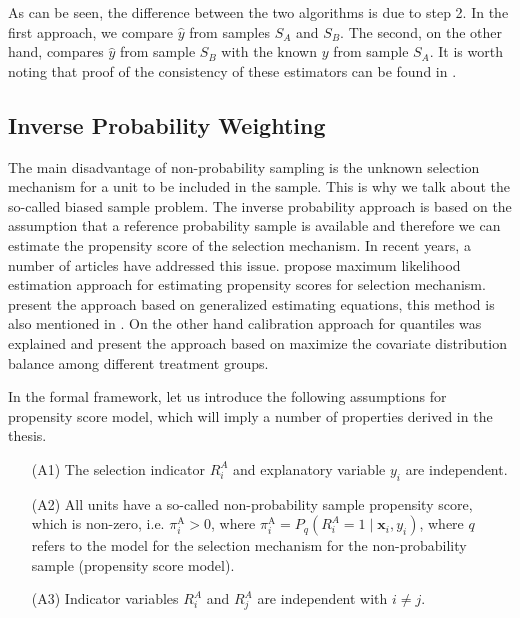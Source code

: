 \documentclass[
]{jss}
\begin{document}
As can be seen, the difference between the two algorithms is due to step
2. In the first approach, we compare \(\hat{y}\) from samples \(S_A\)
and \(S_B\). The second, on the other hand, compares \(\hat{y}\) from
sample \(S_B\) with the known \(y\) from sample \(S_A\). It is worth
noting that proof of the consistency of these estimators can be found in
\citet{Beres}.

\subsection{Inverse Probability Weighting}\label{sec-ipw}

The main disadvantage of non-probability sampling is the unknown
selection mechanism for a unit to be included in the sample. This is why
we talk about the so-called biased sample problem. The inverse
probability approach is based on the assumption that a reference
probability sample is available and therefore we can estimate the
propensity score of the selection mechanism. In recent years, a number
of articles have addressed this issue. \cite{chen2020doubly} propose
maximum likelihood estimation approach for estimating propensity scores
for selection mechanism. \cite{wu2022statistical} present the approach
based on generalized estimating equations, this method is also mentioned
in \cite{yang_doubly_2020}. On the other hand calibration approach for
quantiles was explained \cite{beresewicz2024inference} and
\cite{santanna_covariate_2022} present the approach based on maximize
the covariate distribution balance among different treatment groups.

In the formal framework, let us introduce the following assumptions for
propensity score model, which will imply a number of properties derived
in the thesis.

\begin{itemize}
    \item[(A1)] The selection indicator $R_i^A$ and explanatory variable $y_i$ are independent.
    \item[(A2)]All units have a so-called non-probability sample propensity score, which is non-zero, i.e. $\pi_i^{\mathrm{A}} > 0$, where $\pi_i^{\mathrm{A}} = P_q\left(R_i^A=1 \mid \boldsymbol{x}_i, y_i\right)$, where $q$ refers to the model for the selection mechanism for the non-probability sample (propensity score model).
    \item[(A3)] Indicator variables $R_i^A$ and $R_j^A$ are independent with $i \neq j$. 
\end{itemize}
\end{document}

